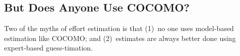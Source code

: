 \documentclass[smallcondesed]{svjour3}
\begin{document}



\subsection{But Does Anyone Use COCOMO?}

 


Two of the myths of effort estimation is that 
(1)~no one uses model-based estimation like COCOMO;
and (2)~estimates are always better done using expert-based guess-timation.
\end{document}
